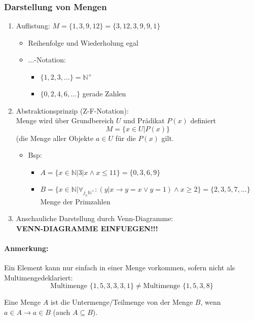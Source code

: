 \subsubsection{Darstellung von Mengen}
\begin{enumerate}
\item Auflistung: $M=\{1,3,9,12\}=\{3,12,3,9,9,1\}$
\begin{itemize}
\item Reihenfolge und Wiederholung egal
\item \glq $\ldots$\grq -Notation:
\begin{itemize}
\item $\{1,2,3,\ldots\}=\mathbb{N}^+$
\item $\{0,2,4,6,\ldots\}$ gerade Zahlen
\end{itemize}
\end{itemize}
\item Abstraktionsprinzip (Z-F-Notation):\\
Menge wird über Grundbereich $U$ und Prädikat $P(x)$ definiert
\[
M=\{x\in U | P(x)\}
\]
(die Menge aller Objekte $a\in U$ für die $P(x)$ gilt.
\begin{itemize}
\item Bsp:
\begin{itemize}
\item $A=\{x\in\mathbb{N}|3|x \land x\leq 11\} = \{0,3,6,9\}$
\item $B=\{x\in\mathbb{N}|\forall_{j_\in\mathbb{N}^+}:(y|x\rightarrow y=x \lor y=1)\land x\geq 2\}=\{2,3,5,7,\ldots \}$ Menge der Primzahlen
\end{itemize}
\end{itemize}
\item Anschauliche Darstellung durch Venn-Diagramme:\\
\textbf{VENN-DIAGRAMME EINFUEGEN!!!}
\end{enumerate}

\paragraph{Anmerkung:} Ein Element kann nur einfach in einer Menge vorkommen, sofern nicht als \glqq Multimenge\grqq deklariert:
\[
\text{Multimenge }\{1,5,3,3,3,1\} \neq \text{Multimenge }\{1,5,3,8\}
\]
\begin{defi}[Teilmenge]
Eine Menge $A$ ist die Untermenge/Teilmenge von der Menge $B$, wenn $a\in A\rightarrow a\in B$ (auch $A\subseteq B$).
\end{defi}

